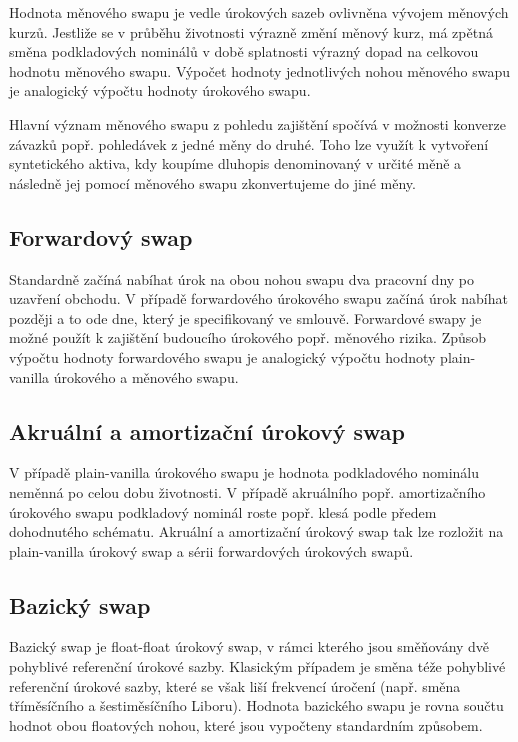 \documentclass[a4paper]{book}
\begin{document}
Hodnota měnového swapu je vedle úrokových sazeb ovlivněna vývojem měnových kurzů. Jestliže se v průběhu životnosti výrazně změní měnový kurz, má zpětná směna podkladových nominálů v době splatnosti výrazný dopad na celkovou hodnotu měnového swapu. Výpočet hodnoty jednotlivých nohou měnového swapu je analogický výpočtu hodnoty úrokového swapu.

Hlavní význam měnového swapu z pohledu zajištění spočívá v možnosti konverze závazků popř. pohledávek z jedné měny do druhé. Toho lze využít k vytvoření syntetického aktiva, kdy koupíme dluhopis denominovaný v určité měně a následně jej pomocí měnového swapu zkonvertujeme do jiné měny.\\

\subsection{Forwardový swap}

Standardně začíná nabíhat úrok na obou nohou swapu dva pracovní dny po uzavření obchodu. V případě forwardového úrokového swapu začíná úrok nabíhat později a to ode dne, který je specifikovaný ve smlouvě. Forwardové swapy je možné použít k zajištění budoucího úrokového popř. měnového rizika. Způsob výpočtu hodnoty forwardového swapu je analogický výpočtu hodnoty plain-vanilla úrokového a měnového swapu.

\subsection{Akruální a amortizační úrokový swap}

V případě plain-vanilla úrokového swapu je hodnota podkladového nominálu neměnná po celou dobu životnosti. V případě akruálního popř. amortizačního úrokového swapu podkladový nominál roste popř. klesá podle předem dohodnutého schématu. Akruální a amortizační úrokový swap tak lze rozložit na plain-vanilla úrokový swap a sérii forwardových úrokových swapů.

\subsection{Bazický swap}

Bazický swap je float-float úrokový swap, v rámci kterého jsou směňovány dvě pohyblivé referenční úrokové sazby. Klasickým případem je směna téže pohyblivé referenční úrokové sazby, které se však liší frekvencí úročení (např. směna tříměsíčního a šestiměsíčního Liboru). Hodnota bazického swapu je rovna součtu hodnot obou floatových nohou, které jsou vypočteny standardním způsobem.
\end{document}
